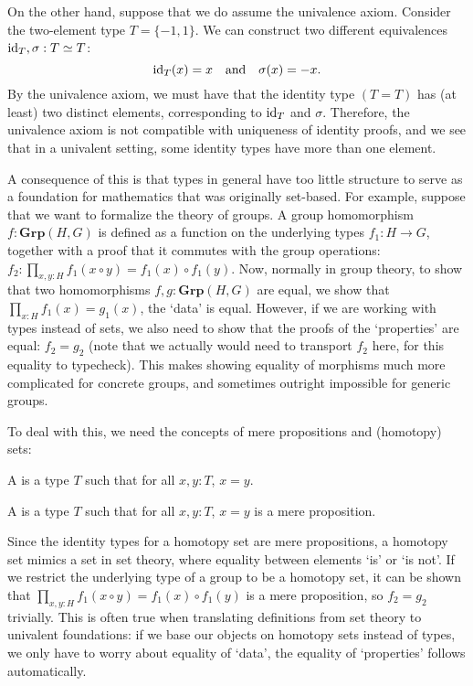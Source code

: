 On the other hand, suppose that we do assume the univalence axiom. Consider the two-element type $ T = \{ -1, 1 \} $. We can construct two different equivalences $ \text{id}_{T}, \sigma: T \simeq T $:
\[ \text{id}_{T}(x) = x \quad \text{and} \quad \sigma(x) = -x. \]
By the univalence axiom, we must have that the identity type $ (T = T) $ has (at least) two distinct elements, corresponding to $ \text{id}_{T} $ and $ \sigma $. Therefore, the univalence axiom is not compatible with uniqueness of identity proofs, and we see that in a univalent setting, some identity types have more than one element.

A consequence of this is that types in general have too little structure to serve as a foundation for mathematics that was originally set-based. For example, suppose that we want to formalize the theory of groups. A group homomorphism $ f: \mathbf{Grp}(H, G) $ is defined as a function on the underlying types $ f_1: H \to G $, together with a proof that it commutes with the group operations: $ f_2: \prod_{x, y: H} f_1(x \circ y) = f_1(x) \circ f_1(y) $. Now, normally in group theory, to show that two homomorphisms $ f, g: \mathbf{Grp}(H, G) $ are equal, we show that $ \prod_{x: H} f_1(x) = g_1(x) $, the `data' is equal. However, if we are working with types instead of sets, we also need to show that the proofs of the `properties' are equal: $ f_2 = g_2 $ (note that we actually would need to transport $ f_2 $ here, for this equality to typecheck). This makes showing equality of morphisms much more complicated for concrete groups, and sometimes outright impossible for generic groups.

To deal with this, we need the concepts of mere propositions and (homotopy) sets:

\begin{definition}
  A  is a type $ T $ such that for all $ x, y: T $, $ x = y $.
\end{definition}

\begin{definition}
  A  is a type $ T $ such that for all $ x, y: T $, $ x = y $ is a mere proposition.
\end{definition}

Since the identity types for a homotopy set are mere propositions, a homotopy set mimics a set in set theory, where equality between elements `is' or `is not'. If we restrict the underlying type of a group to be a homotopy set, it can be shown that $ \prod_{x, y: H} f_1(x \circ y) = f_1(x) \circ f_1(y) $ is a mere proposition, so $ f_2 = g_2 $ trivially. This is often true when translating definitions from set theory to univalent foundations: if we base our objects on homotopy sets instead of types, we only have to worry about equality of `data', the equality of `properties' follows automatically.

